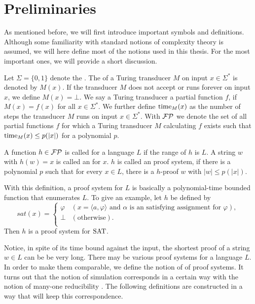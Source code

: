 \chapter{Preliminaries}
  As mentioned before, we will first introduce important symbols and definitions. Although some familiarity with standard notions of complexity theory is assumed, we will here define most of the notions used in this thesis. For the most important ones, we will provide a short discussion.

  Let \(\Sigma = \{ 0, 1 \}\) denote the . The  of a Turing transducer \(M\) on input \(x \in \Sigma^*\) is denoted by \(M(x)\). If the transducer \(M\) does not accept or runs forever on input \(x\), we define \(M(x) = \bot\). We say a Turing transducer  a partial function \(f\), if \(M(x) = f(x)\) for all \(x \in \Sigma^*\). We further define \(\operatorname{time}_M(x)\) as the number of steps the transducer \(M\) runs on input \(x \in \Sigma^*\). With \(\mathcal{FP}\) we denote the set of all partial functions \(f\) for which a Turing transducer \(M\) calculating \(f\) exists such that \(\operatorname{time}_M(x) \leq p(|x|)\) for a polynomial \(p\).

  \begin{definition}
    A function \(h \in \mathcal{FP}\) is called  for a language \(L\) if the range of \(h\) is \(L\). A string \(w\) with \(h(w) = x\) is called an  for \(x\). \(h\) is called an  proof system, if there is a polynomial \(p\) such that for every \(x \in L\), there is a \(h\)-proof \(w\) with \(|w| \leq p(|x|)\).
  \end{definition}

  With this definition, a proof system for \(L\) is basically a polynomial-time bounded function that enumerates \(L\). To give an example, let \(h\) be defined by
    \[
       sat(x) =
       \begin{cases}
         \varphi & (x = \langle a, \varphi \rangle \text{ and \(\alpha\) is an satisfying assignment for \(\varphi\)}), \\
         \perp & (\text{otherwise}). \\
       \end{cases}
    \]
  Then \(h\) is a proof system for \(\text{SAT}\). 
  
  Notice, in spite of its time bound against the input, the shortest proof of a string \(w \in L\) can be be very long. There may be various proof systems for a language \(L\). In order to make them comparable, we define the notion of  of proof systems. It turns out that the notion of simulation corresponds in a certain way with the notion of many-one reducibility \cite{KM00}. The following definitions are constructed in a way that will keep this correspondence.
  
